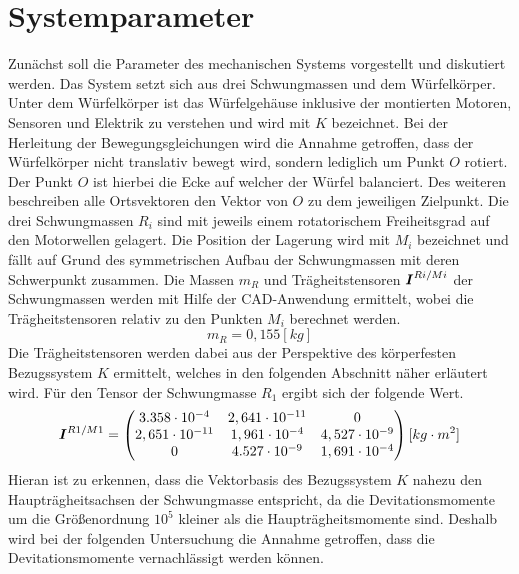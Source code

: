 \section{Systemparameter}
Zunächst soll die Parameter des mechanischen Systems vorgestellt und diskutiert werden. Das System setzt sich aus drei Schwungmassen und dem Würfelkörper. Unter dem Würfelkörper ist das Würfelgehäuse inklusive der montierten Motoren, Sensoren und Elektrik zu verstehen und wird mit $K$ bezeichnet. Bei der Herleitung der Bewegungsgleichungen wird die Annahme getroffen, dass der Würfelkörper nicht translativ bewegt wird, sondern lediglich um Punkt $O$ rotiert. Der Punkt $O$ ist hierbei die Ecke auf welcher der Würfel balanciert. Des weiteren beschreiben alle Ortsvektoren den Vektor von $O$ zu dem jeweiligen Zielpunkt. Die drei Schwungmassen $R_i$ sind mit jeweils einem rotatorischem Freiheitsgrad auf den Motorwellen gelagert. Die Position der Lagerung wird mit $M_i$ bezeichnet und fällt auf Grund des symmetrischen Aufbau der Schwungmassen mit deren Schwerpunkt zusammen.
Die Massen $m_R$ und Trägheitstensoren $\boldsymbol{I}^{Ri/Mi}$ der Schwungmassen werden mit Hilfe der CAD-Anwendung ermittelt, wobei die Trägheitstensoren relativ zu den Punkten $M_i$ berechnet werden.
\begin{equation}
m_R = 0,155 [kg]
\end{equation} 
Die Trägheitstensoren werden dabei aus der Perspektive des körperfesten Bezugssystem $K$ ermittelt, welches in den folgenden Abschnitt näher erläutert wird. Für den Tensor der Schwungmasse $R_1$ ergibt sich der folgende Wert.
\begin{equation}
 \boldsymbol{I}^{R1/M1} = \begin{pmatrix}
3.358\cdot 10^{-4} & 2,641\cdot 10^{-11} & 0 \\
2,651\cdot 10^{-11} & 1,961\cdot 10^{-4} & 4,527\cdot 10^{-9} \\
0 & 4.527\cdot 10^{-9} & 1,691\cdot 10^{-4}
\end{pmatrix}[kg\cdot m^2]
\end{equation}
Hieran ist zu erkennen, dass die Vektorbasis des Bezugssystem $K$ nahezu den Haupträgheitsachsen der Schwungmasse entspricht, da die Devitationsmomente um die Größenordnung $10^{5}$ kleiner als die Haupträgheitsmomente sind. Deshalb wird bei der  
folgenden Untersuchung die Annahme getroffen, dass die Devitationsmomente vernachlässigt werden können. 

